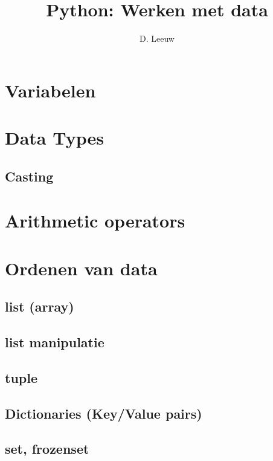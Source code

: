 \documentclass[a4paper,12pt,twoside,titlepage]{article}
\author{D. Leeuw}
\title{Python: Werken met data}
\date{\today\\
0.0.0\\
\vfill
\raggedright
\copyright\ 2025 Dennis Leeuw\\
}
\begin{document}

\maketitle



\section{Variabelen}




\section{Data Types}


\subsection{Casting}



\section{Arithmetic operators}


\section{Ordenen van data}

\subsection{list (array)}

\subsection{list manipulatie}

\subsection{tuple}

\subsection{Dictionaries (Key/Value pairs)}

\subsection{set, frozenset}

\printindex
\end{document}
